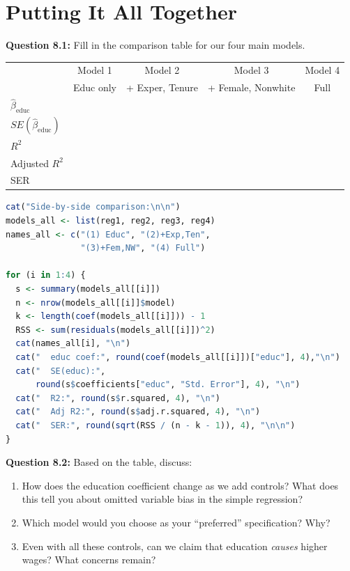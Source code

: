 \documentclass[11pt,letterpaper]{article}
\begin{document}
\vspace{3cm}

\newpage

\section{Putting It All Together}

\textbf{Question 8.1:} Fill in the comparison table for our four main models.

\begin{center}
\small
\begin{tabular}{l|c|c|c|c}
\toprule
 & Model 1 & Model 2 & Model 3 & Model 4 \\
 & Educ only & + Exper, Tenure & + Female, Nonwhite & Full \\
\midrule
$\hat{\beta}_{\text{educ}}$ & & & & \\[6pt]
$SE(\hat{\beta}_{\text{educ}})$ & & & & \\[6pt]
$R^2$ & & & & \\[6pt]
Adjusted $R^2$ & & & & \\[6pt]
SER & & & & \\
\bottomrule
\end{tabular}
\end{center}

\begin{lstlisting}[language=R]
cat("Side-by-side comparison:\n\n")
models_all <- list(reg1, reg2, reg3, reg4)
names_all <- c("(1) Educ", "(2)+Exp,Ten",
               "(3)+Fem,NW", "(4) Full")

for (i in 1:4) {
  s <- summary(models_all[[i]])
  n <- nrow(models_all[[i]]$model)
  k <- length(coef(models_all[[i]])) - 1
  RSS <- sum(residuals(models_all[[i]])^2)
  cat(names_all[i], "\n")
  cat("  educ coef:", round(coef(models_all[[i]])["educ"], 4),"\n")
  cat("  SE(educ):",
      round(s$coefficients["educ", "Std. Error"], 4), "\n")
  cat("  R2:", round(s$r.squared, 4), "\n")
  cat("  Adj R2:", round(s$adj.r.squared, 4), "\n")
  cat("  SER:", round(sqrt(RSS / (n - k - 1)), 4), "\n\n")
}
\end{lstlisting}

\vspace{0.5cm}

\textbf{Question 8.2:} Based on the table, discuss:
\begin{enumerate}[label=(\alph*)]
\item How does the education coefficient change as we add controls? What does this tell you about omitted variable bias in the simple regression?
\item Which model would you choose as your ``preferred'' specification? Why?
\item Even with all these controls, can we claim that education \textit{causes} higher wages? What concerns remain?
\end{enumerate}
\end{document}
